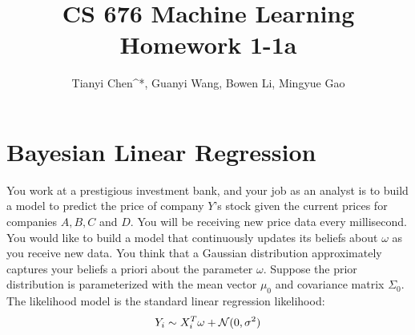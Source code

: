 \documentclass[letterpaper,10pt]{article}
\newcommand{\Nc}{{\cal N}}
\begin{document}
\pagestyle{fancy}
\lhead{}
\chead{}
\rhead{}
\author{Tianyi Chen^{*}, Guanyi Wang, Bowen Li, Mingyue Gao}
\title{CS 676 Machine Learning Homework 1-1a}
\maketitle
\nocite{*}



\section{Bayesian Linear Regression}
You work at a prestigious investment bank, and your job as an analyst is to build a model to predict the price of company $Y$'s stock given the current prices for companies $A,B,C$ and $D$. You will be receiving new price data every millisecond. You would like to build a model that continuously updates its beliefs about $\omega$ as you receive new data. You think that a Gaussian distribution approximately captures your beliefs a priori about the parameter $\omega$. Suppose the prior distribution is parameterized with the mean vector $\mu_0$ and covariance matrix $\Sigma_{0}$. The likelihood model is the standard linear regression likelihood:
\begin{equation}\label{}
 Y_i \sim X_i^T \omega + \Nc (0, \sigma^2)
\end{equation}
\end{document}
